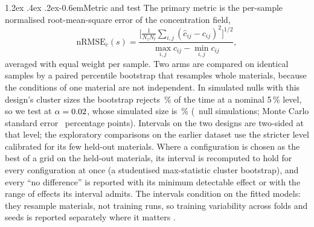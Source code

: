 \documentclass[10pt,a4paper]{article}
\makeatletter
\renewcommand\paragraph{\@startsection{paragraph}{4}{\z@}%
  {1.2ex \@plus .4ex \@minus .2ex}{-0.6em}{\normalfont\normalsize\bfseries}}
\makeatother
\begin{document}
\paragraph{Metric and test} The primary metric is the per-sample normalised root-mean-square
error of the concentration field,
\begin{equation}
\mathrm{nRMSE}_c(s) = \frac{\bigl[\tfrac{1}{N_zN_t}\sum_{i,j}(\hat c_{ij}-c_{ij})^2\bigr]^{1/2}}
{\max_{i,j} c_{ij} - \min_{i,j} c_{ij}} ,
\label{eq:nrmse}
\end{equation}
averaged with equal weight per sample. Two arms are compared on identical samples by a
paired percentile bootstrap that resamples whole materials, because the conditions of one
material are not independent. In simulated nulls with this design's cluster sizes the
bootstrap rejects \nFprFoldsNominal\,\% of the time at a nominal 5\,\% level, so we test at
\(\alpha = 0.02\), whose simulated size is \nFprFoldsCal\,\% (\nAlphaTrials\ null
simulations; Monte Carlo standard error \nAlphaSe\ percentage points). Intervals on the two designs are two-sided at
that level; the exploratory comparisons on the earlier dataset use the stricter level
calibrated for its few held-out materials. Where a configuration
is chosen as the best of a grid on the held-out materials, its interval is recomputed to
hold for every configuration at once (a studentised max-statistic cluster bootstrap),
and every ``no difference'' is reported with its minimum detectable effect or with the
range of effects its interval admits. The intervals condition on the fitted models: they
resample materials, not training runs, so training variability across folds and seeds is
reported separately where it matters \cite{nadeau2003inference}.
\end{document}

